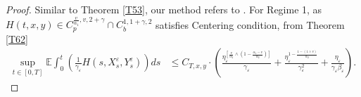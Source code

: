\documentclass[11pt,reqno]{amsart}
\numberwithin{equation}{section}
\begin{document}
\begin{proof}
Similar to Theorem \ref{T53}, our method refers to \cite[Lemma 4.4]{RX}. 
For Regime 1, as  $H(t,x,y)\in C_{p}^{\frac{v}{\alpha_{1}},v,2+\gamma}\cap C_{b}^{1,1+\gamma,2}$ satisfies Centering condition, from Theorem \ref{T62}
\begin{equation}\label{6.41}
	\begin{split}
		\sup_{t\in [0,T]}\mathbb{E}\int_{0}^{t}\left(\frac{1}{\gamma_{\varepsilon}} H(s,X_{s}^{\varepsilon},Y_{s}^{\varepsilon}) \right)ds&\leq C_{T,x,y}\cdot \left( \frac{ \eta_{\varepsilon}^{\left[ \frac{v}{\alpha_{2}}\wedge \left( 1-\frac{\alpha_{1}-v}{\alpha_{2}} \right)  \right]  }}{\gamma_{\varepsilon}}+\frac{ \eta_{\varepsilon}^{1-\frac{1-(1\wedge v)}{\alpha_{2}}}}{\gamma^{2}_{\varepsilon}}+\frac{\eta_{\varepsilon}}{\gamma_{\varepsilon}\beta_{\varepsilon}}\right) .
	\end{split}
\end{equation}


\end{proof}
\end{document}
